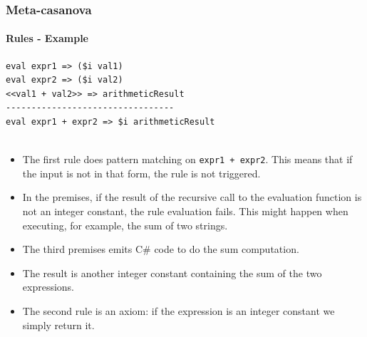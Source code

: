 \documentclass[mathserif,serif]{beamer}
\begin{document}
\begin{frame}[fragile]
	\frametitle{Meta-casanova}
	\framesubtitle{Rules - Example}
	
		\begin{lstlisting}
eval expr1 => ($i val1)
eval expr2 => ($i val2)
<<val1 + val2>> => arithmeticResult
---------------------------------
eval expr1 + expr2 => $i arithmeticResult


	\end{lstlisting}
	
	\begin{itemize}
		\item The first rule does pattern matching on \texttt{expr1 + expr2}. This means that if the input is not in that form, the rule is not triggered.
		\item In the premises, if the result of the recursive call to the evaluation function is not an integer constant, the rule evaluation fails. This might happen when executing, for example, the sum of two strings.
		\item The third premises emits C\# code to do the sum computation.
		\item The result is another integer constant containing the sum of the two expressions.
		\item The second rule is an axiom: if the expression is an integer constant we simply return it.
	\end{itemize}

\end{frame}
\end{document}
